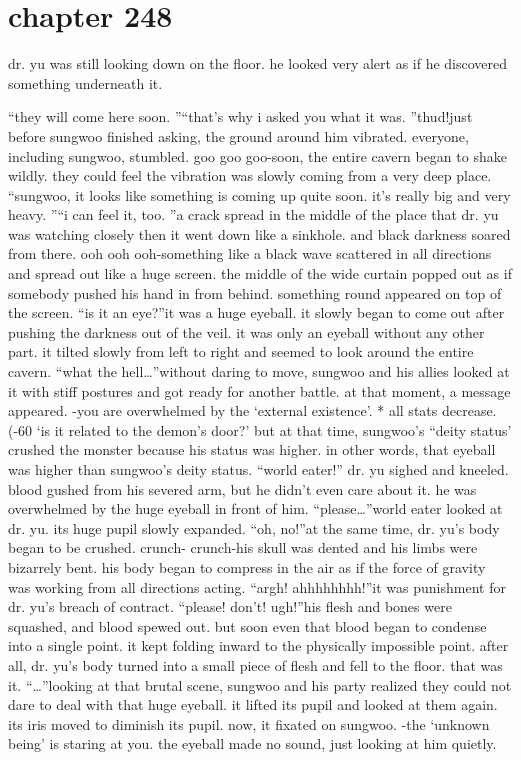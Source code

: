 \section{chapter 248}

                            dr.
 yu was still looking down on the floor.
 he looked very alert as if he discovered something underneath it.





“they will come here soon.
”“that’s why i asked you what it was.
”thud!just before sungwoo finished asking, the ground around him vibrated.
 everyone, including sungwoo, stumbled.
goo goo goo-soon, the entire cavern began to shake wildly.
 they could feel the vibration was slowly coming from a very deep place.
“sungwoo, it looks like something is coming up quite soon.
 it’s really big and very heavy.
”“i can feel it, too.
”a crack spread in the middle of the place that dr.
 yu was watching closely then it went down like a sinkhole.
 and black darkness soared from there.
ooh ooh ooh-something like a black wave scattered in all directions and spread out like a huge screen.
the middle of the wide curtain popped out as if somebody pushed his hand in from behind.
 something round appeared on top of the screen.
“is it an eye?”it was a huge eyeball.
 it slowly began to come out after pushing the darkness out of the veil.
 it was only an eyeball without any other part.
it tilted slowly from left to right and seemed to look around the entire cavern.
“what the hell…”without daring to move, sungwoo and his allies looked at it with stiff postures and got ready for another battle.
at that moment, a message appeared.
-you are overwhelmed by the ‘external existence’.
* all stats decrease.
 (-60%
‘is it related to the demon’s door?’
but at that time, sungwoo’s “deity status’ crushed the monster because his status was higher.
in other words, that eyeball was higher than sungwoo’s deity status.
“world eater!” dr.
 yu sighed and kneeled.
blood gushed from his severed arm, but he didn’t even care about it.
he was overwhelmed by the huge eyeball in front of him.
“please…”world eater looked at dr.
 yu.
 its huge pupil slowly expanded.
“oh, no!”at the same time, dr.
 yu’s body began to be crushed.
crunch- crunch-his skull was dented and his limbs were bizarrely bent.
his body began to compress in the air as if the force of gravity was working from all directions acting.
“argh! ahhhhhhhh!”it was punishment for dr.
 yu’s breach of contract.
“please! don’t! ugh!”his flesh and bones were squashed, and blood spewed out.
 but soon even that blood began to condense into a single point.
 it kept folding inward to the physically impossible point.
after all, dr.
 yu’s body turned into a small piece of flesh and fell to the floor.
that was it.
“…”looking at that brutal scene, sungwoo and his party realized they could not dare to deal with that huge eyeball.
it lifted its pupil and looked at them again.
 its iris moved to diminish its pupil.
 now, it fixated on sungwoo.
-the ‘unknown being’ is staring at you.
the eyeball made no sound, just looking at him quietly.

